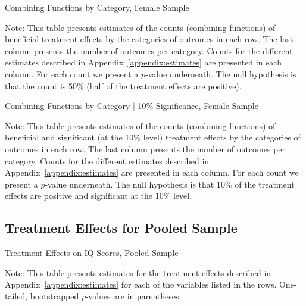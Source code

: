 	\begin{table}[H]
     \caption{Combining Functions by Category, Female Sample} 
     \label{table:abccare_rslt_female_counts_n50a100}
	
	\end{table}
\begin{spacing}{1}
\begin{footnotesize}
\noindent Note: This table presents estimates of the counts (combining functions) of beneficial treatment effects by the categories of outcomes in each row. The last column presents the number of outcomes per category. Counts for the different estimates described in Appendix~\ref{appendix:estimates} are presented in each column. For each count we present a $p$-value underneath. The null hypothesis is that the count is 50\% (half of the treatment effects are positive).
\end{footnotesize}
\end{spacing}   

	\begin{table}[H]
     \caption{Combining Functions by Category $|$ 10\% Significance, Female Sample} 
     \label{table:abccare_rslt_female_counts_n10a10}
	
	\end{table}
\begin{spacing}{1}
\begin{footnotesize}
\noindent Note: This table presents estimates of the counts (combining functions) of beneficial and significant (at the 10\% level) treatment effects by the categories of outcomes in each row. The last column presents the number of outcomes per category. Counts for the different estimates described in Appendix~\ref{appendix:estimates} are presented in each column. For each count we present a $p$-value underneath. The null hypothesis is that 10\% of the treatment effects are positive and significant at the 10\% level.
\end{footnotesize}
\end{spacing}

\clearpage

\subsection{Treatment Effects for Pooled Sample}


	\begin{table}[H]
     \caption{Treatment Effects on IQ Scores, Pooled Sample}
     \label{table:abccare_rslt_pooled_cat0}
	
	\end{table}
\begin{spacing}{1}
\begin{footnotesize}
\noindent Note: This table presents estimates for the treatment effects described in Appendix~\ref{appendix:estimates} for each of the variables listed in the rows.  One-tailed, bootstrapped $p$-values are in parentheses.
\end{footnotesize}
\end{spacing}

